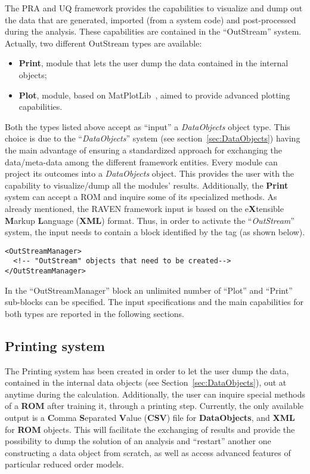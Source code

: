 The PRA and UQ framework provides the capabilities to visualize and dump out the
data that are generated, imported (from a system code) and post-processed during
the analysis.
%
These capabilities are contained in the ``OutStream'' system.
%
Actually, two different OutStream types are available:
\vspace{-5mm}
\begin{itemize}
  \itemsep0em
  \item \textbf{Print}, module that lets the user dump the data contained in the
  internal objects;
  \item \textbf{Plot}, module, based on MatPlotLib~\cite{MatPlotLib}, aimed to
  provide advanced plotting capabilities.
\end{itemize}
\vspace{-5mm}
Both the types listed above accept as ``input'' a \textit{DataObjects} object
type.
%
This choice is due to the ``\textit{DataObjects}'' system (see
section~\ref{sec:DataObjects}) having the main advantage of ensuring a standardized
approach for exchanging the data/meta-data among the different framework
entities.
%
Every module can project its outcomes into a \textit{DataObjects} object.
%
This provides the user with the capability to visualize/dump all the modules'
results.
%
Additionally, the \textbf{Print} system can accept a ROM and inquire some of its
specialized methods.
%
As already mentioned, the RAVEN
framework input is based on the e\textbf{X}tensible \textbf{M}arkup
\textbf{L}anguage (\textbf{XML}) format.
%
Thus, in order to activate the ``\textit{OutStream}'' system, the input needs to
contain a block identified by the  tag (as shown
below).

\begin{lstlisting}[style=XML]
<OutStreamManager>
  <!-- "OutStream" objects that need to be created-->
</OutStreamManager>
\end{lstlisting}

In the ``OutStreamManager'' block an unlimited number of ``Plot'' and ``Print''
sub-blocks can be specified.
%
The input specifications and the main capabilities for both types are reported
in the following sections.
%
%
\subsection{Printing system \label{sec:printing}}
The Printing system has been created in order to let the user dump the data,
contained in the internal data objects (see Section~\ref{sec:DataObjects}), out
at anytime during the calculation.
%
Additionally, the user can inquire special methods of a \textbf{ROM} after training it,
through a printing step.
%
Currently, the only available output is a \textbf{C}omma \textbf{S}eparated
\textbf{V}alue (\textbf{CSV}) file for \textbf{DataObjects}, and \textbf{XML}
for \textbf{ROM} objects.
%
%
This will facilitate the exchanging of results and provide the possibility to
dump the solution of an analysis and ``restart'' another one constructing a
data object from scratch, as well as access advanced features of particular
reduced order models.
%
